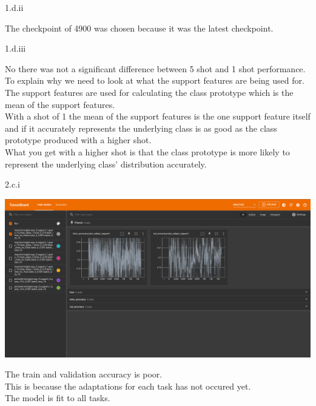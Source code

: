 \LARGE
1.d.ii
\normalsize

\begin{answer}
	The checkpoint of 4900 was chosen because it was the latest checkpoint.
\end{answer}

\LARGE
1.d.iii
\normalsize

\begin{answer}
	No there was not a significant difference between 5 shot and 1 shot performance. \\
	To explain why we need to look at what the support features are being used for. \\
	The support features are used for calculating the class prototype which is the mean of the support features. \\
	With a shot of 1 the mean of the support features is the one support feature itself and if it accurately represents the underlying class is as good as the class prototype produced with a higher shot. \\
	What you get with a higher shot is that the class prototype is more likely to represent the underlying class' distribution accurately. \\
\end{answer}
        
\clearpage

\LARGE
2.c.i
\normalsize

\begin{answer}
	\begin{center}
		\includegraphics[width=1.0\textwidth]{pre_adapt}
	\end{center}
	The train and validation accuracy is poor. \\
	This is because the adaptations for each task has not occured yet. \\
	The model is fit to all tasks.
\end{answer}

